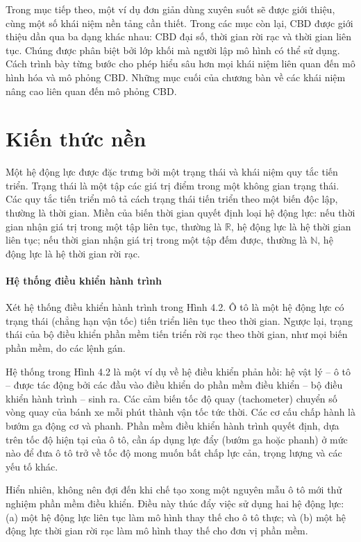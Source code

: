 Trong mục tiếp theo, một ví dụ đơn giản dùng xuyên suốt sẽ được giới thiệu, cùng một số khái niệm nền tảng cần thiết. Trong các mục còn lại, CBD được giới thiệu dần qua ba dạng khác nhau: CBD đại số, thời gian rời rạc và thời gian liên tục. Chúng được phân biệt bởi lớp khối mà người lập mô hình có thể sử dụng. Cách trình bày từng bước cho phép hiểu sâu hơn mọi khái niệm liên quan đến mô hình hóa và mô phỏng CBD. Những mục cuối của chương bàn về các khái niệm nâng cao liên quan đến mô phỏng CBD.

\section{Kiến thức nền}
Một hệ động lực được đặc trưng bởi một trạng thái và khái niệm quy tắc tiến triển. Trạng thái là một tập các giá trị điểm trong một không gian trạng thái. Các quy tắc tiến triển mô tả cách trạng thái tiến triển theo một biến độc lập, thường là thời gian. Miền của biến thời gian quyết định loại hệ động lực: nếu thời gian nhận giá trị trong một tập liên tục, thường là $\mathbb{R}$, hệ động lực là hệ thời gian liên tục; nếu thời gian nhận giá trị trong một tập đếm được, thường là $\mathbb{N}$, hệ động lực là hệ thời gian rời rạc.
\paragraph{Hệ thống điều khiển hành trình}

Xét hệ thống điều khiển hành trình trong Hình 4.2. Ô tô là một hệ động lực có trạng thái (chẳng hạn vận tốc) tiến triển liên tục theo thời gian. Ngược lại, trạng thái của bộ điều khiển phần mềm tiến triển rời rạc theo thời gian, như mọi biến phần mềm, do các lệnh gán.

Hệ thống trong Hình 4.2 là một ví dụ về hệ điều khiển phản hồi: hệ vật lý -- ô tô -- được tác động bởi các đầu vào điều khiển do phần mềm điều khiển -- bộ điều khiển hành trình -- sinh ra. Các cảm biến tốc độ quay (tachometer) chuyển số vòng quay của bánh xe mỗi phút thành vận tốc tức thời. Các cơ cấu chấp hành là bướm ga động cơ và phanh. Phần mềm điều khiển hành trình quyết định, dựa trên tốc độ hiện tại của ô tô, cần áp dụng lực đẩy (bướm ga hoặc phanh) ở mức nào để đưa ô tô trở về tốc độ mong muốn bất chấp lực cản, trọng lượng và các yếu tố khác.

Hiển nhiên, không nên đợi đến khi chế tạo xong một nguyên mẫu ô tô mới thử nghiệm phần mềm điều khiển. Điều này thúc đẩy việc sử dụng hai hệ động lực: (a) một hệ động lực liên tục làm mô hình thay thế cho ô tô thực; và (b) một hệ động lực thời gian rời rạc làm mô hình thay thế cho đơn vị phần mềm.


